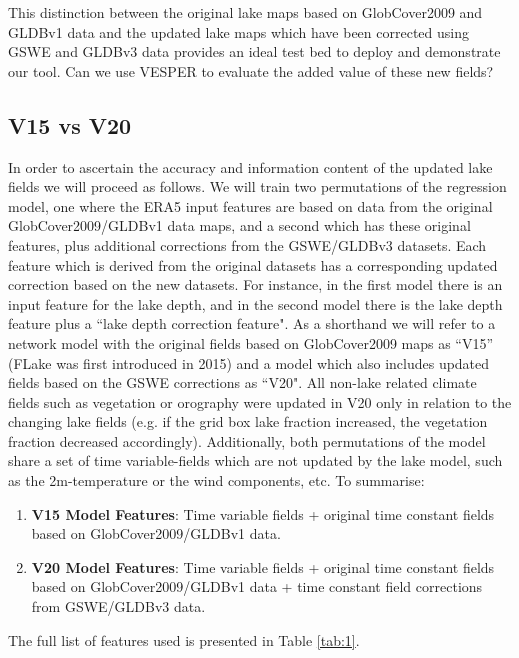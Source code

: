 \documentclass[twocolumn]{article}
\begin{document}
\noindent This distinction between the original lake maps based on GlobCover2009 and GLDBv1 data and the updated lake maps which have been corrected using GSWE and GLDBv3 data provides an ideal test bed to deploy and demonstrate our tool. Can we use VESPER to evaluate the added value of these new fields? 

\subsection{V15 vs V20}
In order to ascertain the accuracy and information content of the updated lake fields we will proceed as follows. We will train two permutations of the regression model, one where the ERA5 input features are based on data from the original GlobCover2009/GLDBv1 data maps, and a second which has these original features, plus additional corrections from the GSWE/GLDBv3 datasets. Each feature which is derived from the original datasets has a corresponding updated correction based on the new datasets. For instance, in the first model there is an input feature for the lake depth, and in the second model there is the lake depth feature plus a ``lake depth correction feature". As a shorthand we will refer to a network model with the original fields based on GlobCover2009 maps as ``V15'' (FLake was first introduced in 2015) and a model which also includes updated fields based on the GSWE corrections as ``V20". All non-lake related climate fields such as vegetation or orography were updated in V20 only in relation to the changing lake fields (e.g. if the grid box lake fraction increased, the vegetation fraction decreased accordingly). Additionally, both permutations of the model share a set of time variable-fields which are not updated by the lake model, such as the 2m-temperature or the wind components, etc. To summarise:
\begin{enumerate}
	\item \textbf{V15 Model Features}: Time variable fields + original time constant fields based on GlobCover2009/GLDBv1 data.
	\item \textbf{V20 Model Features}: Time variable fields + original time constant fields based on GlobCover2009/GLDBv1 data + time constant field corrections from GSWE/GLDBv3 data.
\end{enumerate}
The full list of features used is presented in Table \ref{tab:1}. 
\end{document}
